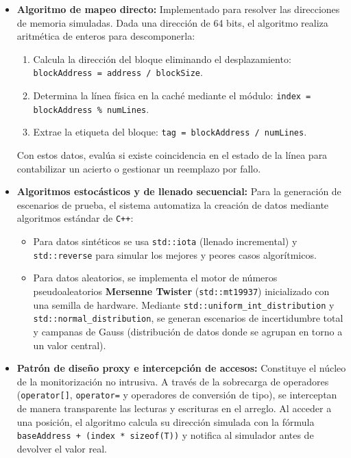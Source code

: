 \documentclass[12pt, a4paper]{article}
\begin{document}
	\begin{itemize}
		\item \textbf{Algoritmo de mapeo directo:} Implementado para resolver las direcciones de memoria simuladas. Dada una dirección de 64 bits, el algoritmo realiza aritmética de enteros para descomponerla:
		
		\begin{enumerate}
			\item Calcula la dirección del bloque eliminando el desplazamiento: \texttt{blockAddress = address / blockSize}.
			\item Determina la línea física en la caché mediante el módulo: \texttt{index = blockAddress \% numLines}.
			\item Extrae la etiqueta del bloque: \texttt{tag = blockAddress / numLines}.
		\end{enumerate}
		
		Con estos datos, evalúa si existe coincidencia en el estado de la línea para contabilizar un acierto o gestionar un reemplazo por fallo.
		
		\item \textbf{Algoritmos estocásticos y de llenado secuencial:} Para la generación de escenarios de prueba, el sistema automatiza la creación de datos mediante algoritmos estándar de \texttt{C++}:
		\begin{itemize}
			\item Para datos sintéticos se usa \texttt{std::iota} (llenado incremental) y \texttt{std::reverse} para simular los mejores y peores casos algorítmicos.
			
			\item Para datos aleatorios, se implementa el motor de números pseudoaleatorios \textbf{Mersenne Twister} (\texttt{std::mt19937}) inicializado con una semilla de hardware. Mediante \texttt{std::uniform\_int\_distribution} y \texttt{std::normal\_distribution}, se generan escenarios de incertidumbre total y campanas de Gauss (distribución de datos donde se agrupan en torno a un valor central).
		\end{itemize}
		
		\item \textbf{Patrón de diseño proxy e intercepción de accesos:} Constituye el núcleo de la monitorización no intrusiva. A través de la sobrecarga de operadores (\texttt{operator[]}, \texttt{operator=} y operadores de conversión de tipo), se interceptan de manera transparente las lecturas y escrituras en el arreglo. Al acceder a una posición, el algoritmo calcula su dirección simulada con la fórmula \texttt{baseAddress + (index * sizeof(T))} y notifica al simulador antes de devolver el valor real.
	\end{itemize}
	
\end{document}
